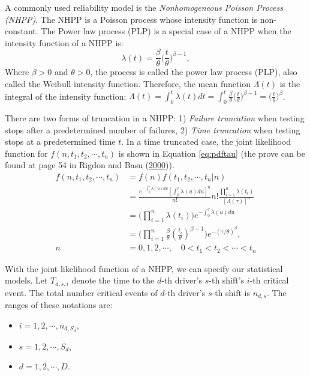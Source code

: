 \documentclass[12pt]{book}
\numberwithin{equation}{chapter}
\providecommand{\tightlist}{%
  \setlength{\itemsep}{0pt}\setlength{\parskip}{0pt}}
\begin{document}
A commonly used reliability model is the \emph{Nonhomogeneous Poisson Process (NHPP)}. The NHPP is a Poisson process whose intensity function is non-constant. The Power law process (PLP) is a special case of a NHPP when the intensity function of a NHPP is:
\begin{equation}
\lambda(t) = \frac{\beta}{\theta}\bigg(\frac{t}{\theta}\bigg)^{\beta-1},
\label{eq:plp}
\end{equation}
Where \(\beta > 0\) and \(\theta > 0\), the process is called the power law process (PLP), also called the Weibull intensity function. Therefore, the mean function \(\Lambda(t)\) is the integral of the intensity function: \(\Lambda(t) = \int_0^t \lambda(t)dt = \int_0^t \frac{\beta}{\theta}\bigg(\frac{t}{\theta}\bigg)^{\beta-1} = \bigg(\frac{t}{\theta}\bigg)^{\beta}\).

There are two forms of truncation in a NHPP: 1) \emph{Failure truncation} when testing stops after a predetermined number of failures, 2) \emph{Time truncation} when testing stops at a predetermined time \(t\). In a time truncated case, the joint likelihood function for \(f(n, t_1, t_2, \cdots, t_n)\) is shown in Equation \eqref{eq:pdftau} (the prove can be found at page 54 in Rigdon and Basu (\protect\hyperlink{ref-rigdon2000statistical}{2000})).
\begin{equation}
\begin{aligned}
f(n, t_1, t_2, \cdots, t_n) & = f(n)f(t_1, t_2, \cdots, t_n|n)\\
& = \frac{e^{-\int_0^\tau \lambda(u)du}[\int_0^\tau \lambda(u)du]^n}{n!}n!\frac{\prod_{i=1}^n\lambda(t_i)}{[\Lambda(\tau)]^n}\\
& = \Big(\prod_{i=1}^n\lambda(t_i) \Big)e^{-\int_0^\tau \lambda(u)du}\\
& = \Big(\prod_{i=1}^n\frac{\beta}{\theta}(\frac{t_i}{\theta})^{\beta - 1} \Big)e^{-(\tau/\theta)^\beta},\\ 
n & = 0, 1, 2, \cdots, \quad  0 < t_1 < t_2 < \cdots < t_n
\label{eq:pdftau}
\end{aligned}
\end{equation}

With the joint likelihood function of a NHPP, we can specify our statistical models. Let \(T_{d, s, i}\) denote the time to the \(d\)-th driver's \(s\)-th shift's \(i\)-th critical event. The total number critical events of \(d\)-th driver's \(s\)-th shift is \(n_{d,s}\). The ranges of these notations are:

\begin{itemize}
\tightlist
\item
  \(i = 1, 2, \cdots, n_{d, S_d}\),
\item
  \(s = 1, 2, \cdots, S_d\),
\item
  \(d = 1, 2, \cdots, D\).
\end{itemize}
\end{document}
